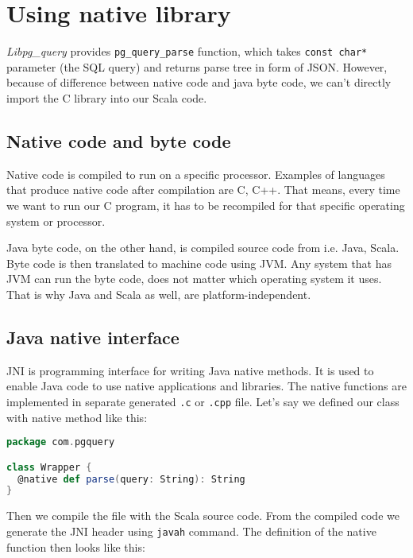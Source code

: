 \section{Using native library}
\textit{Libpg\_query} provides \texttt{pg\_query\_parse} function, which takes \texttt{const char*} parameter (the SQL query) and returns parse tree in form of JSON. However, because of difference between native code and java byte code, we can't directly import the C library into our Scala code.

\subsection{Native code and byte code}
Native code is compiled to run on a specific processor. Examples of languages that produce native code after compilation are C, C++. That means, every time we want to run our C program, it has to be recompiled for that specific operating system or processor.

Java byte code, on the other hand, is compiled source code from i.e. Java, Scala. Byte code is then translated to machine code using JVM. Any system that has JVM can run the byte code, does not matter which operating system it uses. That is why Java and Scala as well, are platform-independent.

\subsection{Java native interface}
JNI is programming interface for writing Java native methods.\cite{JNI} It is used to enable Java code to use native applications and libraries. The native functions are implemented in separate generated \texttt{.c} or \texttt{.cpp} file. Let's say we defined our class with native method like this:

\begin{lstlisting}[language=scala, basicstyle=\ttfamily, showstringspaces=false, caption={Scala class with native method}, xleftmargin=.05in]
package com.pgquery

class Wrapper {
  @native def parse(query: String): String
}
\end{lstlisting}

Then we compile the file with the Scala source code. From the compiled code we generate the JNI header using \texttt{javah} command. The definition of the native function then looks like this: 

